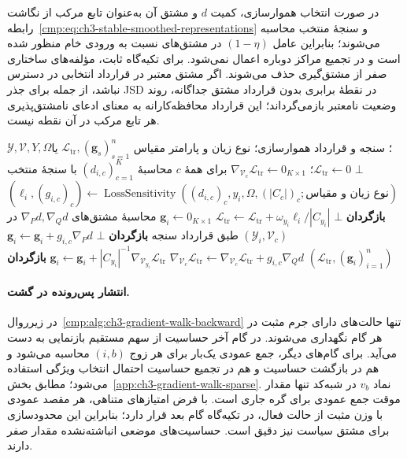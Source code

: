 در صورت انتخاب هموارسازی، کمیت $d$ و مشتق
آن به‌عنوان تابع مرکب از نگاشت
رابطه~\eqref{cmp:eq:ch3-stable-smoothed-representations}
و سنجهٔ منتخب محاسبه می‌شوند؛ بنابراین
عامل $(1-\eta)$ در مشتق‌های نسبت به ورودی
خام منظور شده است و در تجمیع مراکز
دوباره اعمال نمی‌شود. برای تکیه‌گاه ثابت،
مؤلفه‌های ساختاری صفر از مشتق‌گیری حذف
می‌شوند. اگر مشتق معتبر در قرارداد انتخابی
در دسترس نباشد، از جمله برای جذر JSD
در نقطهٔ برابری بدون قرارداد مشتق جداگانه،
روند وضعیت نامعتبر بازمی‌گرداند؛ این
قرارداد محافظه‌کارانه به معنای ادعای
نامشتق‌پذیری هر تابع مرکب در آن نقطه نیست.

\begin{algorithm}[!htbp]
\caption{زیرروال $\operatorname{RepresentationGradient}$: انتشار مشتق سنجه‌ها}
\label{cmp:alg:ch3-gradient-representations}
\begin{algorithmic}[1]
\REQUIRE $\mathscr Y,\mathcal V,Y,\Omega$؛ سنجه و قرارداد هموارسازی؛
نوع زیان و پارامتر مقیاس
\ENSURE $\mathcal L_{\mathrm{tr}},(\mathbf g_s)_{s=1}^{n}$ یا $\bot$
\STATE $\mathcal L_{\mathrm{tr}}\gets0$؛
$\nabla_{\mathcal V_c}\mathcal L_{\mathrm{tr}}\gets0_{K\times1}$
برای همهٔ $c$
    \STATE محاسبهٔ $(d_{i,c})_{c=1}^{K}$ با سنجهٔ منتخب
    \STATE $(\ell_i,(g_{i,c})_c)\gets
    \operatorname{LossSensitivity}((d_{i,c})_c,y_i,\Omega,(|C_c|)_c;\text{نوع زیان و مقیاس})$
        \STATE \textbf{بازگردان} $\bot$
    \ENDIF
    \STATE $\mathcal L_{\mathrm{tr}}\gets
    \mathcal L_{\mathrm{tr}}+\omega_{y_i}\ell_i/|C_{y_i}|$
    \STATE $\mathbf g_i\gets0_{K\times1}$
        \STATE محاسبهٔ مشتق‌های $\nabla_Pd,\nabla_Qd$
        در $(\mathscr Y_i,\mathcal V_c)$ طبق قرارداد سنجه
            \STATE \textbf{بازگردان} $\bot$
        \ENDIF
        \STATE $\mathbf g_i\gets\mathbf g_i+g_{i,c}\nabla_Pd$
        \STATE $\nabla_{\mathcal V_c}\mathcal L_{\mathrm{tr}}\gets
        \nabla_{\mathcal V_c}\mathcal L_{\mathrm{tr}}
        +g_{i,c}\nabla_Qd$
    \ENDFOR
\ENDFOR
{}
    \STATE $\mathbf g_i\gets\mathbf g_i+
    |C_{y_i}|^{-1}\nabla_{\mathcal V_{y_i}}\mathcal L_{\mathrm{tr}}$
\ENDFOR
\STATE \textbf{بازگردان} $(\mathcal L_{\mathrm{tr}},(\mathbf g_i)_{i=1}^{n})$
\end{algorithmic}
\end{algorithm}

\paragraph{انتشار پس‌رونده در گشت.}
در زیرروال~\ref{cmp:alg:ch3-gradient-walk-backward}
تنها حالت‌های دارای جرم مثبت در هر گام
نگهداری می‌شوند. در گام آخر حساسیت از
سهم مستقیم بازنمایی به دست می‌آید.
برای گام‌های دیگر، جمع عمودی یک‌بار
برای هر زوج $(i,b)$ محاسبه می‌شود و
هم در بازگشت حساسیت و هم در تجمیع
حساسیت احتمال انتخاب ویژگی استفاده
می‌شود؛ مطابق
بخش~\ref{app:ch3-gradient-walk-sparse}.
نماد $v_b$ در شبه‌کد تنها مقدار موقت
جمع عمودی برای گره جاری است.
با فرض امتیازهای متناهی، هر مقصد
عمودی با وزن مثبت از حالت فعال،
در تکیه‌گاه گام بعد قرار دارد؛ بنابراین
این محدودسازی برای مشتق سیاست نیز دقیق
است. حساسیت‌های موضعی انباشته‌نشده
مقدار صفر دارند.

